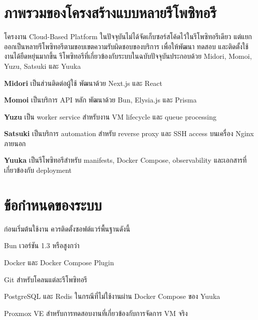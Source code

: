 \vspace{-0.5in}

\section{ภาพรวมของโครงสร้างแบบหลายรีโพซิทอรี}
\hspace*{1.3em}
โครงงาน Cloud-Based Platform ในปัจจุบันไม่ได้จัดเก็บซอร์สโค้ดไว้ในรีโพซิทอรีเดียว แต่แยกออกเป็นหลายรีโพซิทอรีตามขอบเขตความรับผิดชอบของบริการ เพื่อให้พัฒนา ทดสอบ และติดตั้งใช้งานได้ยืดหยุ่นมากขึ้น รีโพซิทอรีที่เกี่ยวข้องกับระบบในฉบับปัจจุบันประกอบด้วย Midori, Momoi, Yuzu, Satsuki และ Yuuka

\begin{mycustomenum2}
    \item \textbf{Midori} เป็นส่วนติดต่อผู้ใช้ พัฒนาด้วย Next.js และ React
    \item \textbf{Momoi} เป็นบริการ API หลัก พัฒนาด้วย Bun, Elysia.js และ Prisma
    \item \textbf{Yuzu} เป็น worker service สำหรับงาน VM lifecycle และ queue processing
    \item \textbf{Satsuki} เป็นบริการ automation สำหรับ reverse proxy และ SSH access บนเครื่อง Nginx ภายนอก
    \item \textbf{Yuuka} เป็นรีโพซิทอรีสำหรับ manifests, Docker Compose, observability และเอกสารที่เกี่ยวข้องกับ deployment
\end{mycustomenum2}

\section{ข้อกำหนดของระบบ}
\hspace*{1.3em}
ก่อนเริ่มต้นใช้งาน ควรติดตั้งซอฟต์แวร์พื้นฐานดังนี้

\begin{mycustomenum2}
    \item Bun เวอร์ชัน 1.3 หรือสูงกว่า
    \item Docker และ Docker Compose Plugin
    \item Git สำหรับโคลนแต่ละรีโพซิทอรี
    \item PostgreSQL และ Redis ในกรณีที่ไม่ใช้งานผ่าน Docker Compose ของ Yuuka
    \item Proxmox VE สำหรับการทดสอบงานที่เกี่ยวข้องกับการจัดการ VM จริง
\end{mycustomenum2}

